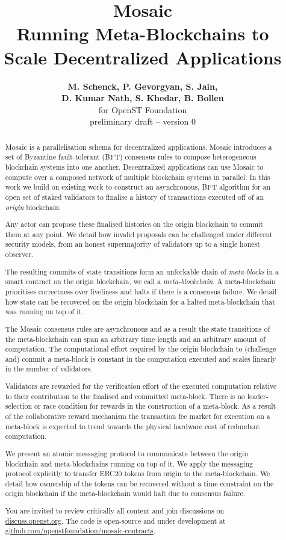 \documentclass[12pt,a4paper]{article}
\title{Mosaic\\\sc\Large{Running Meta-Blockchains to \\ Scale Decentralized Applications}}
\author{\textbf{M. Schenck, P. Gevorgyan, S. Jain,}\\ \textbf{D. Kumar Nath, S. Khedar, B. Bollen}\\ for OpenST Foundation \\ preliminary draft -- version 0}
\begin{document}
\maketitle

\begin{abstract}
Mosaic is a parallelisation schema for decentralized applications.
Mosaic introduces a set of Byzantine fault-tolerant (BFT) consensus rules to compose heterogeneous blockchain systems into one another.
Decentralized applications can use Mosaic to compute over a composed network of multiple blockchain systems in parallel.
In this work we build on existing work to construct an asynchronous, BFT algorithm for an open set of staked validators to finalise a history of transactions executed off of an \emph{origin} blockchain.

Any actor can propose these finalised histories on the origin blockchain to commit them at any point. We detail how invalid proposals can be challenged under different security models, from an honest supermajority of validators up to a single honest observer.

The resulting commits of state transitions form an unforkable chain of \emph{meta-blocks} in a smart contract on the origin blockchain, we call a \emph{meta-blockchain}.
A meta-blockchain prioritises correctness over liveliness and halts if there is a consensus failure.
We detail how state can be recovered on the origin blockchain for a halted meta-blockchain that was running on top of it.

The Mosaic consensus rules are asynchronous and as a result the state transitions of the meta-blockchain can span an arbitrary time length and an arbitrary amount of computation.
The computational effort required by the origin blockchain to (challenge and) commit a meta-block is constant in the computation executed and scales linearly in the number of validators.

Validators are rewarded for the verification effort of the executed computation relative to their contribution to the finalised and committed meta-block.
There is no leader-selection or race condition for rewards in the construction of a meta-block.
As a result of the collaborative reward mechanism the transaction fee market for execution on a meta-block is expected to trend towards the physical hardware cost of redundant computation.

We present an atomic messaging protocol to communicate between the origin blockchain and meta-blockchains running on top of it.
We apply the messaging protocol explicitly to transfer ERC20 tokens from origin to the meta-blockchain.
We detail how ownership of the tokens can be recovered without a time constraint on the origin blockchain if the meta-blockchain would halt due to consensus failure.

You are invited to review critically all content and join discussions on \mbox{\url{discuss.openst.org}}.
The code is open-source and under development at \url{github.com/openstfoundation/mosaic-contracts}.
\end{abstract}
\end{document}
